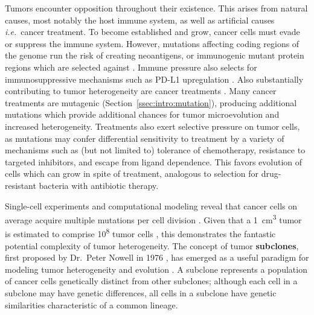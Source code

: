 Tumors encounter opposition throughout their existence. This arises from natural causes, most notably the host immune system, as well as artificial causes \textit{i.e.}\ cancer treatment. To become established and grow, cancer cells must evade or suppress the immune system. However, mutations affecting coding regions of the genome run the risk of creating neoantigens, or immunogenic mutant protein regions which are selected against \cite{vitale2021}. Immune pressure also selects for immunosuppressive mechanisms such as PD-L1 upregulation \cite{kim2016}. Also substantially contributing to tumor heterogeneity are cancer treatments \cite{dagogojack2017}. Many cancer treatments are mutagenic (Section~\ref{ssec:intro:mutation}), producing additional mutations which provide additional chances for tumor microevolution and increased heterogeneity. Treatments also exert selective pressure on tumor cells, as mutations may confer differential sensitivity to treatment by a variety of mechanisms such as (but not limited to) tolerance of chemotherapy, resistance to targeted inhibitors, and escape from ligand dependence. This favors evolution of cells which can grow in spite of treatment, analogous to selection for drug-resistant bacteria with antibiotic therapy.

Single-cell experiments and computational modeling reveal that cancer cells on average acquire multiple mutations per cell division \cite{tsyvina2020,werner2020}. Given that a 1~cm\textsuperscript{3} tumor is estimated to comprise \textapprox{}10\textsuperscript{8} tumor cells \cite{monte2009}, this demonstrates the fantastic potential complexity of tumor heterogeneity. The concept of tumor \textbf{subclones}, first proposed by Dr.\ Peter Nowell in 1976 \cite{nowell1976}, has emerged as a useful paradigm for modeling tumor heterogeneity and evolution \cite{zhu2021}. A subclone represents a population of cancer cells genetically distinct from other subclones; although each cell in a subclone may have genetic differences, all cells in a subclone have genetic similarities characteristic of a common lineage.

